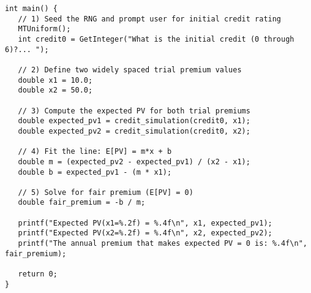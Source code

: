 \documentclass{report}
\begin{document}
\begin{lstlisting}
int main() {
   // 1) Seed the RNG and prompt user for initial credit rating
   MTUniform();
   int credit0 = GetInteger("What is the initial credit (0 through 6)?... ");

   // 2) Define two widely spaced trial premium values
   double x1 = 10.0;
   double x2 = 50.0;

   // 3) Compute the expected PV for both trial premiums
   double expected_pv1 = credit_simulation(credit0, x1);
   double expected_pv2 = credit_simulation(credit0, x2);

   // 4) Fit the line: E[PV] = m*x + b
   double m = (expected_pv2 - expected_pv1) / (x2 - x1);
   double b = expected_pv1 - (m * x1);

   // 5) Solve for fair premium (E[PV] = 0)
   double fair_premium = -b / m;

   printf("Expected PV(x1=%.2f) = %.4f\n", x1, expected_pv1);
   printf("Expected PV(x2=%.2f) = %.4f\n", x2, expected_pv2);
   printf("The annual premium that makes expected PV = 0 is: %.4f\n", fair_premium);

   return 0;
}
\end{lstlisting}
\end{document}
